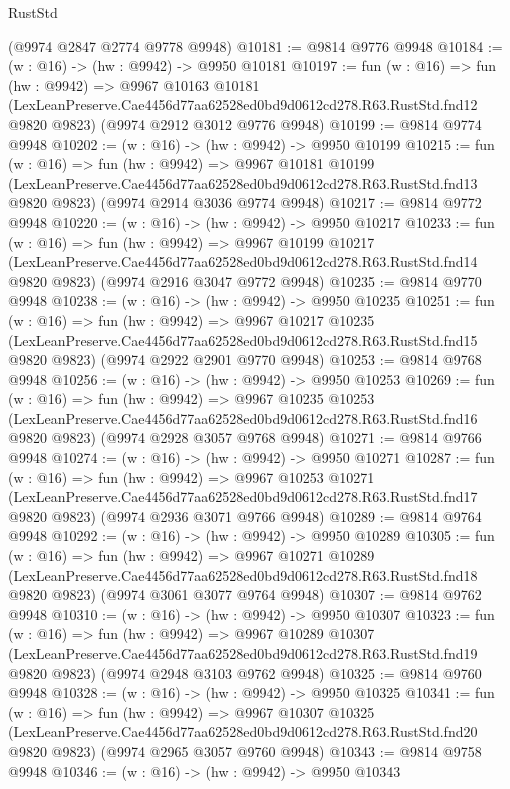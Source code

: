 \begin{lexlean}{RustStd}
\begin{coremodule}
    (@9974 @2847 @2774 @9778 @9948)
@10181 := @9814 @9776 @9948
@10184 := (w : @16) -> (hw : @9942) -> @9950 @10181
@10197 := fun (w : @16) =>
  fun (hw : @9942) =>
  @9967
    @10163
    @10181
    (LexLeanPreserve.Cae4456d77aa62528ed0bd9d0612cd278.R63.RustStd.fnd12 @9820 @9823)
    (@9974 @2912 @3012 @9776 @9948)
@10199 := @9814 @9774 @9948
@10202 := (w : @16) -> (hw : @9942) -> @9950 @10199
@10215 := fun (w : @16) =>
  fun (hw : @9942) =>
  @9967
    @10181
    @10199
    (LexLeanPreserve.Cae4456d77aa62528ed0bd9d0612cd278.R63.RustStd.fnd13 @9820 @9823)
    (@9974 @2914 @3036 @9774 @9948)
@10217 := @9814 @9772 @9948
@10220 := (w : @16) -> (hw : @9942) -> @9950 @10217
@10233 := fun (w : @16) =>
  fun (hw : @9942) =>
  @9967
    @10199
    @10217
    (LexLeanPreserve.Cae4456d77aa62528ed0bd9d0612cd278.R63.RustStd.fnd14 @9820 @9823)
    (@9974 @2916 @3047 @9772 @9948)
@10235 := @9814 @9770 @9948
@10238 := (w : @16) -> (hw : @9942) -> @9950 @10235
@10251 := fun (w : @16) =>
  fun (hw : @9942) =>
  @9967
    @10217
    @10235
    (LexLeanPreserve.Cae4456d77aa62528ed0bd9d0612cd278.R63.RustStd.fnd15 @9820 @9823)
    (@9974 @2922 @2901 @9770 @9948)
@10253 := @9814 @9768 @9948
@10256 := (w : @16) -> (hw : @9942) -> @9950 @10253
@10269 := fun (w : @16) =>
  fun (hw : @9942) =>
  @9967
    @10235
    @10253
    (LexLeanPreserve.Cae4456d77aa62528ed0bd9d0612cd278.R63.RustStd.fnd16 @9820 @9823)
    (@9974 @2928 @3057 @9768 @9948)
@10271 := @9814 @9766 @9948
@10274 := (w : @16) -> (hw : @9942) -> @9950 @10271
@10287 := fun (w : @16) =>
  fun (hw : @9942) =>
  @9967
    @10253
    @10271
    (LexLeanPreserve.Cae4456d77aa62528ed0bd9d0612cd278.R63.RustStd.fnd17 @9820 @9823)
    (@9974 @2936 @3071 @9766 @9948)
@10289 := @9814 @9764 @9948
@10292 := (w : @16) -> (hw : @9942) -> @9950 @10289
@10305 := fun (w : @16) =>
  fun (hw : @9942) =>
  @9967
    @10271
    @10289
    (LexLeanPreserve.Cae4456d77aa62528ed0bd9d0612cd278.R63.RustStd.fnd18 @9820 @9823)
    (@9974 @3061 @3077 @9764 @9948)
@10307 := @9814 @9762 @9948
@10310 := (w : @16) -> (hw : @9942) -> @9950 @10307
@10323 := fun (w : @16) =>
  fun (hw : @9942) =>
  @9967
    @10289
    @10307
    (LexLeanPreserve.Cae4456d77aa62528ed0bd9d0612cd278.R63.RustStd.fnd19 @9820 @9823)
    (@9974 @2948 @3103 @9762 @9948)
@10325 := @9814 @9760 @9948
@10328 := (w : @16) -> (hw : @9942) -> @9950 @10325
@10341 := fun (w : @16) =>
  fun (hw : @9942) =>
  @9967
    @10307
    @10325
    (LexLeanPreserve.Cae4456d77aa62528ed0bd9d0612cd278.R63.RustStd.fnd20 @9820 @9823)
    (@9974 @2965 @3057 @9760 @9948)
@10343 := @9814 @9758 @9948
@10346 := (w : @16) -> (hw : @9942) -> @9950 @10343

\end{coremodule}
\end{lexlean}
